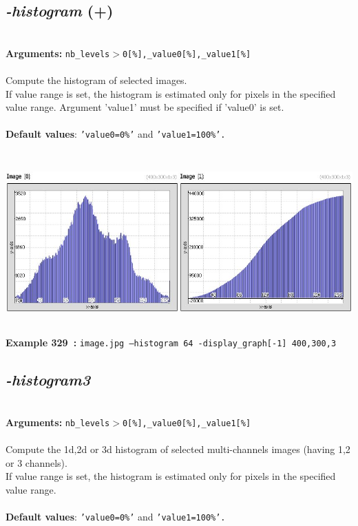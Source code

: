 \documentclass[a4paper,11pt,twoside]{book}
\begin{document}
\subsection{\emph{-histogram} (+)}\vspace*{-0.5em}
~\\\textbf{Arguments: } 
{\small \texttt{nb\_levels$>$0[\%],\_value0[\%],\_value1[\%]}}\\~\\
Compute the histogram of selected images.
~\\If value range is set, the histogram is estimated only for pixels in the specified
value range. Argument 'value1' must be specified if 'value0' is set.
~\\~\\\textbf{Default values}: {\small \texttt{'value0=0\%'} and \texttt{'value1=100\%'.}}
\begin{center}\includegraphics[keepaspectratio=true,height=7cm,width=\textwidth]{img/gmic_def329.jpg}\\
{\footnotesize \textbf{Example 329~:} \texttt{image.jpg --histogram 64 -display\_graph[-1] 400,300,3}}
\end{center}

\subsection{\emph{-histogram3} }\vspace*{-0.5em}
~\\\textbf{Arguments: } 
{\small \texttt{nb\_levels$>$0[\%],\_value0[\%],\_value1[\%]}}\\~\\
Compute the 1d,2d or 3d histogram of selected multi-channels images (having 1,2 or 3 channels).
~\\If value range is set, the histogram is estimated only for pixels in the specified
value range.
~\\~\\\textbf{Default values}: {\small \texttt{'value0=0\%'} and \texttt{'value1=100\%'.}}
\end{document}
